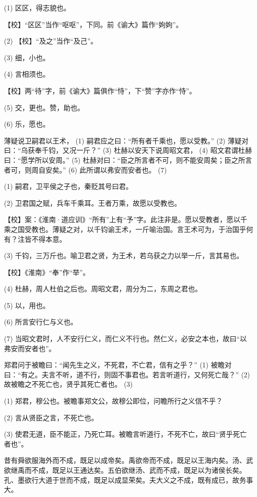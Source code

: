\documentclass[12pt,UTF8]{ctexbook}
\begin{document}
(1) 区区，得志貌也。

【校】“区区”当作“呕呕”，下同。前《谕大》篇作“姁姁”。

(2) 【校】“及之”当作“及己”。

(3) 细，小也。

(4) 言相须也。

【校】两“待”字，前《谕大》篇俱作“恃”，下“赞”字亦作“恃”。

(5) 交，更也。赞，助也。

(6) 乐，愿也。

薄疑说卫嗣君以王术， (1) 嗣君应之曰：“所有者千乘也，愿以受教。” (2) 薄疑对曰：“乌获奉千钧，又况一斤？” (3) 杜赫以安天下说周昭文君， (4) 昭文君谓杜赫曰：“愿学所以安周。” (5) 杜赫对曰：“臣之所言者不可，则不能安周矣；臣之所言者可，则周自安矣。” (6) 此所谓以弗安而安者也。 (7)

(1) 嗣君，卫平侯之子也，秦贬其号曰君。

(2) 卫君国之赋，兵车千乘耳。王者万乘，故愿以受教也。

【校】案：《淮南·道应训》“所有”上有“予”字。此注非是。愿以受教者，愿以千乘之国受教也。薄疑之对，以千钧谕王术，一斤喻治国。言王术可为，于治国乎何有？注皆不得本意。

(3) 千钧，三万斤也。喻卫君之贤，为王术，若乌获之力以举一斤，言其易也。

【校】《淮南》“奉”作“举”。

(4) 杜赫，周人杜伯之后也。周昭文君，周分为二，东周之君也。

(5) 以，用也。

(6) 所言安行仁与义也。

(7) 当昭文君时，人不安行仁义，而仁义不行也。然仁义，必安之本也，故曰“以弗安而安者也”。

郑君问于被瞻曰：“闻先生之义，不死君，不亡君，信有之乎？” (1) 被瞻对曰：“有之。夫言不听，道不行，则固不事君也。若言听道行，又何死亡哉？” (2) 故被瞻之不死亡也，贤乎其死亡者也。 (3)

(1) 郑君，穆公也。被瞻事郑文公，故穆公即位，问瞻所行之义信不乎？

(2) 言从贤臣之言，不死亡也。

(3) 使君无道，臣不能正，乃死亡耳。被瞻言听道行，不死不亡，故曰“贤乎死亡者也”。

昔有舜欲服海外而不成，既足以成帝矣。禹欲帝而不成，既足以王海内矣。汤、武欲继禹而不成，既足以王通达矣。五伯欲继汤、武而不成，既足以为诸侯长矣。孔、墨欲行大道于世而不成，既足以成显荣矣。夫大义之不成，既有成已，故务事大。
\end{document}
